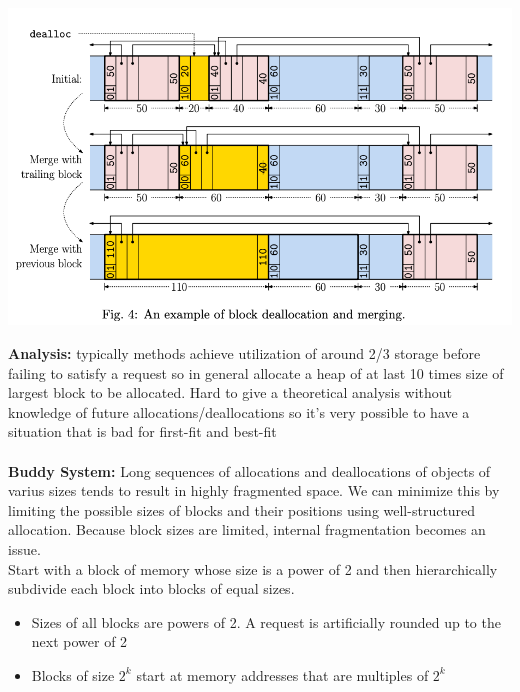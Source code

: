 \documentclass{article}
\begin{document}
  \begin{center}
  \includegraphics[scale=0.4]{MemoryDeallocation}
  \end{center}
  \textbf{Analysis: }typically methods achieve utilization of around 2/3 storage before failing to satisfy a request so in general allocate a heap of at last 10 times size of largest block to be allocated. Hard to give a theoretical analysis without knowledge of future allocations/deallocations so it's very possible to have a situation that is bad for first-fit and best-fit\\ \\
  \textbf{Buddy System: }Long sequences of allocations and deallocations of objects of varius sizes tends to result in highly fragmented space. We can minimize this by limiting the possible sizes of blocks and their positions using well-structured allocation. Because block sizes are limited, internal fragmentation becomes an issue. \\
  Start with a block of memory whose size is a power of 2 and then hierarchically subdivide each block into blocks of equal sizes.
  \begin{itemize}[noitemsep]
    \item Sizes of all blocks are powers of 2. A request is artificially rounded up to the next power of 2
    \item Blocks of size $2^{k}$ start at memory addresses that are multiples of $2^{k}$
  \end{itemize}
\end{document}
